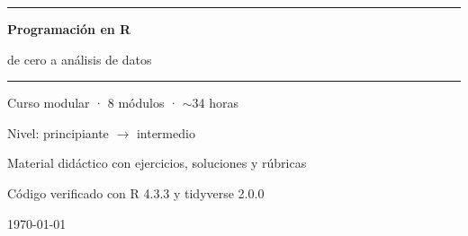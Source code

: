 \documentclass[11pt, a4paper, oneside]{report}
\begin{document}
\hypersetup{pageanchor=false}
\begin{titlepage}
  \centering
  \vspace*{3cm}
  {\color{rblue}\rule{\linewidth}{1.5pt}\par}
  \vspace{0.8cm}
  {\Huge\bfseries\color{rblue} Programación en R\par}
  \vspace{0.4cm}
  {\LARGE de cero a análisis de datos\par}
  \vspace{0.8cm}
  {\color{rblue}\rule{\linewidth}{1.5pt}\par}
  \vspace{1.5cm}
  {\large Curso modular · 8 módulos · $\sim$34 horas\par}
  \vspace{0.3cm}
  {\large Nivel: principiante $\rightarrow$ intermedio\par}
  \vfill
  {\large Material didáctico con ejercicios, soluciones y rúbricas\par}
  \vspace{0.3cm}
  {\normalsize Código verificado con R 4.3.3 y tidyverse 2.0.0\par}
  \vspace{1cm}
  {\large \today\par}
\end{titlepage}
\hypersetup{pageanchor=true}

\tableofcontents










\end{document}
